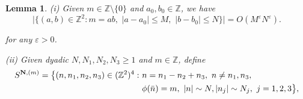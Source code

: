 \documentclass[%
11pt,  reqno]{amsart}
\newtheorem{lemma}[theorem]{Lemma}
\newcommand{\1}{\hspace{0.2mm}\text{I}\hspace{0.2mm}}
\newcommand{\noi}{\noindent}
\newcommand{\Z}{\mathbb{Z}}
\newcommand{\eps}{\varepsilon}
\numberwithin{equation}{section}
\numberwithin{theorem}{section}
\begin{document}
\begin{lemma}
\label{LEM:count1}
{\rm (i)} 
Given $m\in\Z\setminus \{0\}$
and $a_0,b_0\in \Z$, 
we have
\begin{equation}
\big|\big\{(a, b)\in \Z^2: m=ab,\,\,|a-a_0|\leq M,\,\,|b-b_0|\leq N\big\}\big|
= O(M^\eps N^\eps).
\label{count0}
\end{equation}

\noi
for any $\eps > 0$.


\medskip

\noi
{\rm (ii)}
Given 
dyadic $N, N_1, N_2, N_3\ge 1$ 
and  $m \in \Z$, define 
\begin{align}
\label{SN1}
\begin{split}
S^{{\bf N}, (m)} = \big\{(n, n_1, n_2, n_3)\in (\Z^2)^4
: \ & n=n_1-n_2+n_3, \
 n\ne n_1, n_3, \\
& \phi(\bar n) = m, \ 
|n|\sim N, 
|n_j|\sim  N_j, \ j = 1, 2, 3\big\}, 
\end{split}
\end{align}


\end{lemma}
\end{document}
